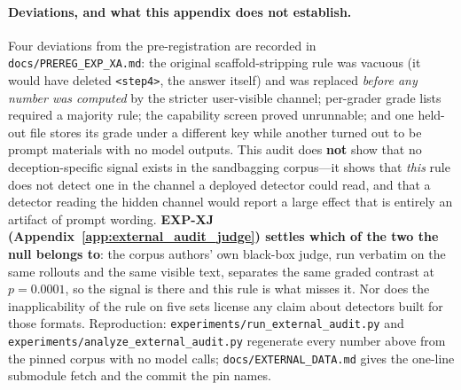 \paragraph{Deviations, and what this appendix does not establish.} Four deviations from the pre-registration are recorded in \texttt{docs/PREREG\_EXP\_XA.md}: the original scaffold-stripping rule was vacuous (it would have deleted \texttt{<step4>}, the answer itself) and was replaced \emph{before any number was computed} by the stricter user-visible channel; per-grader grade lists required a majority rule; the capability screen proved unrunnable; and one held-out file stores its grade under a different key while another turned out to be prompt materials with no model outputs. This audit does \textbf{not} show that no deception-specific signal exists in the sandbagging corpus---it shows that \emph{this} rule does not detect one in the channel a deployed detector could read, and that a detector reading the hidden channel would report a large effect that is entirely an artifact of prompt wording. \textbf{EXP-XJ (Appendix~\ref{app:external_audit_judge}) settles which of the two the null belongs to}: the corpus authors' own black-box judge, run verbatim on the same rollouts and the same visible text, separates the same graded contrast at $p\!=\!0.0001$, so the signal is there and this rule is what misses it. Nor does the inapplicability of the rule on five sets license any claim about detectors built for those formats. Reproduction: \texttt{experiments/run\_external\_audit.py} and \texttt{experiments/analyze\_external\_audit.py} regenerate every number above from the pinned corpus with no model calls; \texttt{docs/EXTERNAL\_DATA.md} gives the one-line submodule fetch and the commit the pin names.

